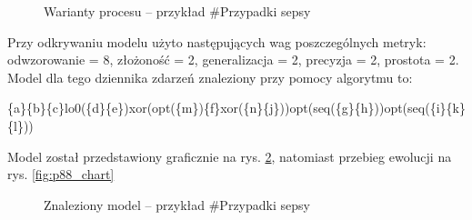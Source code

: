 \begin{figure}[H]
	\caption{\label{fig:p88_variants}Warianty procesu -- przykład \#Przypadki sepsy}
\end{figure}

Przy odkrywaniu modelu użyto następujących wag poszczególnych metryk: odwzorowanie = 8, złożoność = 2, generalizacja = 2, precyzja = 2, prostota = 2. Model dla tego dziennika zdarzeń znaleziony przy pomocy algorytmu to:
\begin{center}
	\{a\}\{b\}\{c\}lo0(\{d\}\{e\})xor(opt(\{m\})\{f\}xor(\{n\}\{j\}))opt(seq(\{g\}\{h\}))opt(seq(\{i\}\{k\}\{l\}))
\end{center}
Model został przedstawiony graficznie na rys. \ref{fig:p88_model}, natomiast przebieg ewolucji na rys. \ref{fig:p88_chart}

\begin{figure}[H]
	\caption{\label{fig:p88_model}Znaleziony model -- przykład \#Przypadki sepsy}
\end{figure}

